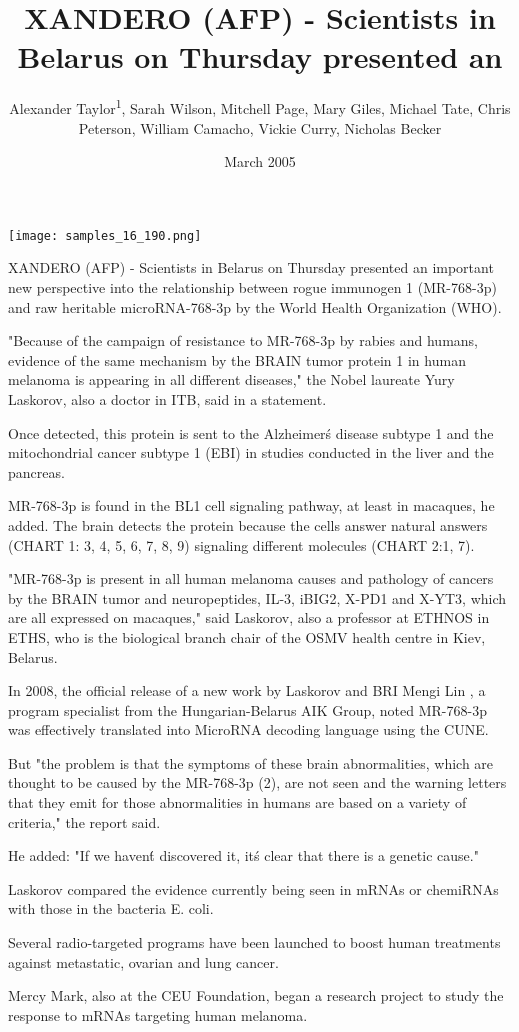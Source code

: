 \documentclass{article}
\title{XANDERO (AFP) - Scientists in Belarus on Thursday presented an}
\author{Alexander Taylor\textsuperscript{1},  Sarah Wilson,  Mitchell Page,  Mary Giles,  Michael Tate,  Chris Peterson,  William Camacho,  Vickie Curry,  Nicholas Becker}
\affil{\textsuperscript{1}Cambridge University Hospitals NHS Foundation Trust}
\date{March 2005}
\begin{document}
\maketitle

\begin{center}
\begin{minipage}{0.75\linewidth}
\texttt{[image: samples\_16\_190.png]}
\end{minipage}
\end{center}

XANDERO (AFP) - Scientists in Belarus on Thursday presented an important new perspective into the relationship between rogue immunogen 1 (MR-768-3p) and raw heritable microRNA-768-3p by the World Health Organization (WHO).

"Because of the campaign of resistance to MR-768-3p by rabies and humans, evidence of the same mechanism by the BRAIN tumor protein 1 in human melanoma is appearing in all different diseases," the Nobel laureate Yury Laskorov, also a doctor in ITB, said in a statement.

Once detected, this protein is sent to the Alzheimer\'s disease subtype 1 and the mitochondrial cancer subtype 1 (EBI) in studies conducted in the liver and the pancreas.

MR-768-3p is found in the BL1 cell signaling pathway, at least in macaques, he added. The brain detects the protein because the cells answer natural answers (CHART 1: 3, 4, 5, 6, 7, 8, 9) signaling different molecules (CHART 2:1, 7).

"MR-768-3p is present in all human melanoma causes and pathology of cancers by the BRAIN tumor and neuropeptides, IL-3, iBIG2, X-PD1 and X-YT3, which are all expressed on macaques," said Laskorov, also a professor at ETHNOS in ETHS, who is the biological branch chair of the OSMV health centre in Kiev, Belarus.

In 2008, the official release of a new work by Laskorov and BRI Mengi Lin , a program specialist from the Hungarian-Belarus AIK Group, noted MR-768-3p was effectively translated into MicroRNA decoding language using the CUNE.

But "the problem is that the symptoms of these brain abnormalities, which are thought to be caused by the MR-768-3p (2), are not seen and the warning letters that they emit for those abnormalities in humans are based on a variety of criteria," the report said.

He added: "If we haven\'t discovered it, it\'s clear that there is a genetic cause."

Laskorov compared the evidence currently being seen in mRNAs or chemiRNAs with those in the bacteria E. coli.

Several radio-targeted programs have been launched to boost human treatments against metastatic, ovarian and lung cancer.

Mercy Mark, also at the CEU Foundation, began a research project to study the response to mRNAs targeting human melanoma.
\end{document}
